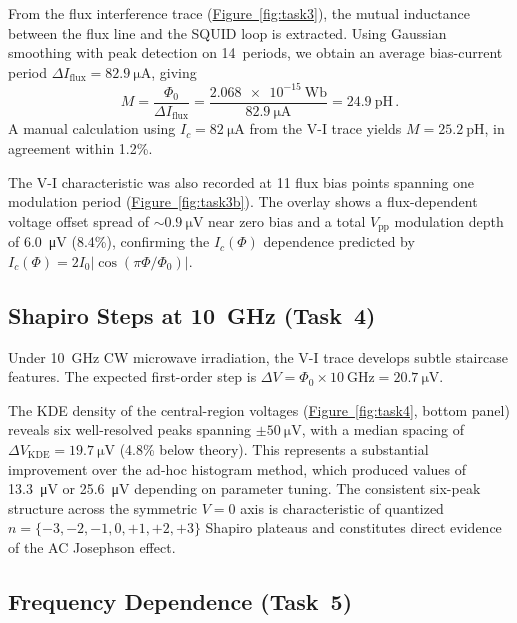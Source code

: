 \documentclass[12pt,a4paper]{article}
\begin{document}
From the flux interference trace (\hyperref[fig:task3]{Figure~\ref*{fig:task3}}),
the mutual inductance between the flux line and the SQUID loop is extracted. Using
Gaussian smoothing with peak detection on 14~periods, we obtain an average
bias-current period $\Delta I_\mathrm{flux} = \SI{82.9}{\micro\ampere}$, giving
\begin{equation}
    M = \frac{\Phi_0}{\Delta I_\mathrm{flux}}
      = \frac{\SI{2.068e-15}{\weber}}{\SI{82.9}{\micro\ampere}}
      = \SI{24.9}{\pico\henry}\,.
    \label{eq:mutual}
\end{equation}
A manual calculation using $I_c = \SI{82}{\micro\ampere}$ from the V-I trace yields
$M = \SI{25.2}{\pico\henry}$, in agreement within 1.2\%.

The V-I characteristic was also recorded at 11 flux bias points spanning one
modulation period (\hyperref[fig:task3b]{Figure~\ref*{fig:task3b}}). The overlay
shows a flux-dependent voltage offset spread of $\sim\!\SI{0.9}{\micro\volt}$ near
zero bias and a total $V_\mathrm{pp}$ modulation depth of \SI{6.0}{\micro\volt}
(8.4\%), confirming the $I_c(\Phi)$ dependence predicted by
$I_c(\Phi) = 2I_0|\cos(\pi\Phi/\Phi_0)|$.


\subsection{Shapiro Steps at \SI{10}{\giga\hertz} (Task~4)}

Under \SI{10}{\giga\hertz} CW microwave irradiation, the V-I trace develops subtle
staircase features. The expected first-order step is
$\Delta V = \Phi_0 \times \SI{10}{\giga\hertz} = \SI{20.7}{\micro\volt}$.

The KDE density of the central-region voltages
(\hyperref[fig:task4]{Figure~\ref*{fig:task4}}, bottom panel) reveals six
well-resolved peaks spanning $\pm\SI{50}{\micro\volt}$, with a median spacing of
$\Delta V_\mathrm{KDE} = \SI{19.7}{\micro\volt}$ (4.8\% below theory). This
represents a substantial improvement over the ad-hoc histogram method, which
produced values of \SI{13.3}{\micro\volt} or \SI{25.6}{\micro\volt} depending on
parameter tuning. The consistent six-peak structure across the symmetric $V = 0$
axis is characteristic of quantized $n = \{-3, -2, -1, 0, +1, +2, +3\}$ Shapiro
plateaus and constitutes direct evidence of the AC Josephson effect.


\subsection{Frequency Dependence (Task~5)}
\end{document}
